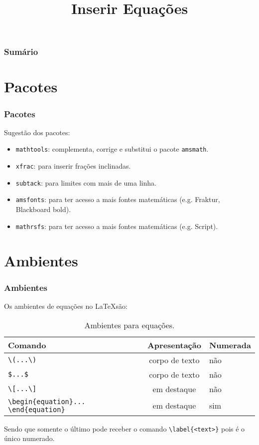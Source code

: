\documentclass[brazilian]{beamer}
\title{Inserir Equações}
\begin{document}
    \frame{\titlepage}
    
    \begin{frame}
        \frametitle{Sumário}
        \tableofcontents
    \end{frame}

\section{Pacotes}
\begin{frame}
    \frametitle{Pacotes}

    Sugestão dos pacotes:
    \begin{itemize}
        \item \texttt{mathtools}: complementa, corrige e substitui o pacote \texttt{amsmath}. 
        \item \texttt{xfrac}: para inserir frações inclinadas.
        \item \texttt{subtack}: para limites com mais de uma linha. 
        \item \texttt{amsfonts}: para ter acesso a mais fontes matemáticas (e.g. Fraktur, Blackboard bold).
        \item \texttt{mathrsfs}: para ter acesso a mais fontes matemáticas (e.g. Script).
    \end{itemize}

\end{frame}


\section{Ambientes}
\begin{frame}[fragile]
    \frametitle{Ambientes}
    Os ambientes de equações no \LaTeX são:

    \begin{table}
        \caption{Ambientes para equações.}
        \label{tab:Ambientes}
        \begin{tabular}{M{4.5cm}cl}
            Comando & Apresentação & Numerada \\ \hline
            \lstinline[style=myStyleLatex]!\(...\)! & corpo de texto & não \\ \hline
            \lstinline[style=myStyleLatex]!$...$! & corpo de texto & não \\ \hline
            \lstinline[style=myStyleLatex]!\[...\]! & em destaque & não \\ \hline
            \lstinline[style=myStyleLatex]!\begin{equation}... \end{equation}! & em destaque & sim \\ \hline
        \end{tabular}
    \end{table}
    Sendo que somente o último pode receber o comando \lstinline[style=myStyleLatex]!\label{<text>}! pois é o único numerado.

\end{frame}
\end{document}
